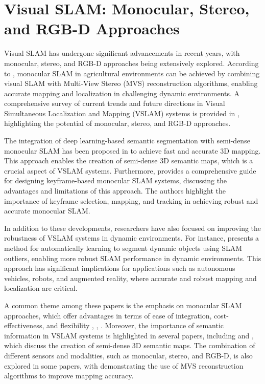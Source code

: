 \documentclass[conference]{IEEEtran}
\begin{document}
\section{Visual SLAM: Monocular, Stereo, and RGB-D Approaches}
Visual SLAM has undergone significant advancements in recent years, with monocular, stereo, and RGB-D approaches being extensively explored. According to \cite{b1}, monocular SLAM in agricultural environments can be achieved by combining visual SLAM with Multi-View Stereo (MVS) reconstruction algorithms, enabling accurate mapping and localization in challenging dynamic environments. A comprehensive survey of current trends and future directions in Visual Simultaneous Localization and Mapping (VSLAM) systems is provided in \cite{b2}, highlighting the potential of monocular, stereo, and RGB-D approaches.

The integration of deep learning-based semantic segmentation with semi-dense monocular SLAM has been proposed in \cite{b3} to achieve fast and accurate 3D mapping. This approach enables the creation of semi-dense 3D semantic maps, which is a crucial aspect of VSLAM systems. Furthermore, \cite{b4} provides a comprehensive guide for designing keyframe-based monocular SLAM systems, discussing the advantages and limitations of this approach. The authors highlight the importance of keyframe selection, mapping, and tracking in achieving robust and accurate monocular SLAM.

In addition to these developments, researchers have also focused on improving the robustness of VSLAM systems in dynamic environments. For instance, \cite{b5} presents a method for automatically learning to segment dynamic objects using SLAM outliers, enabling more robust SLAM performance in dynamic environments. This approach has significant implications for applications such as autonomous vehicles, robots, and augmented reality, where accurate and robust mapping and localization are critical.

A common theme among these papers is the emphasis on monocular SLAM approaches, which offer advantages in terms of ease of integration, cost-effectiveness, and flexibility \cite{b1}, \cite{b3}, \cite{b4}. Moreover, the importance of semantic information in VSLAM systems is highlighted in several papers, including \cite{b2} and \cite{b3}, which discuss the creation of semi-dense 3D semantic maps. The combination of different sensors and modalities, such as monocular, stereo, and RGB-D, is also explored in some papers, with \cite{b1} demonstrating the use of MVS reconstruction algorithms to improve mapping accuracy.
\end{document}
